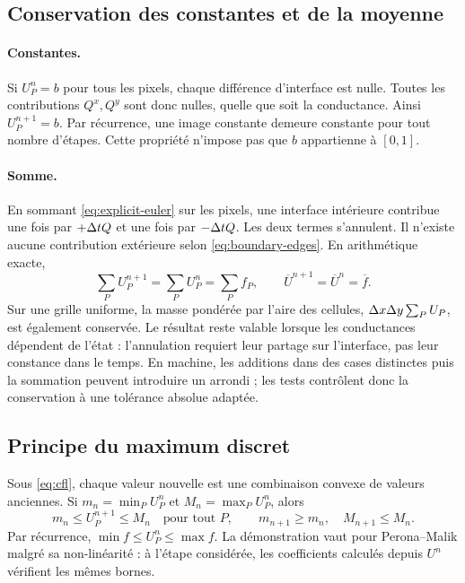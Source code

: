 \subsection{Conservation des constantes et de la moyenne}

\paragraph{Constantes.}
Si $U^n_P=b$ pour tous les pixels, chaque différence d'interface est
nulle. Toutes les contributions $Q^x,Q^y$ sont donc nulles, quelle
que soit la conductance. Ainsi $U^{n+1}_P=b$. Par récurrence, une image
constante demeure constante pour tout nombre d'étapes. Cette propriété
n'impose pas que $b$ appartienne à $[0,1]$.

\paragraph{Somme.}
En sommant \eqref{eq:explicit-euler} sur les pixels, une interface
intérieure contribue une fois par $+\Delta t Q$ et une fois par
$-\Delta t Q$. Les deux termes s'annulent. Il n'existe aucune contribution
extérieure selon \eqref{eq:boundary-edges}. En arithmétique exacte,
\begin{equation}
 \sum_P U^{n+1}_P=\sum_P U^n_P=\sum_P f_P,
 \qquad \overline U^{n+1}=\overline U^n=\overline f.
 \label{eq:discrete-mass}
\end{equation}
Sur une grille uniforme, la masse pondérée par l'aire des cellules,
$\Delta x\Delta y\sum_P U_P$, est également conservée. Le résultat reste
valable lorsque les conductances dépendent de l'état : l'annulation
requiert leur partage sur l'interface, pas leur constance dans le
temps. En machine, les additions dans des cases distinctes puis la
sommation peuvent introduire un arrondi ; les tests contrôlent donc
la conservation à une tolérance absolue adaptée.

\subsection{Principe du maximum discret}

Sous \eqref{eq:cfl}, chaque valeur nouvelle est une combinaison
convexe de valeurs anciennes. Si $m_n=\min_P U^n_P$ et
$M_n=\max_P U^n_P$, alors
\begin{equation}
 m_n\leq U^{n+1}_P\leq M_n\quad\text{pour tout }P,
 \qquad m_{n+1}\geq m_n,\quad M_{n+1}\leq M_n.
 \label{eq:discrete-maximum}
\end{equation}
Par récurrence, $\min f\leq U^n_P\leq\max f$. La démonstration vaut
pour Perona--Malik malgré sa non-linéarité : à l'étape considérée,
les coefficients calculés depuis $U^n$ vérifient les mêmes bornes.


